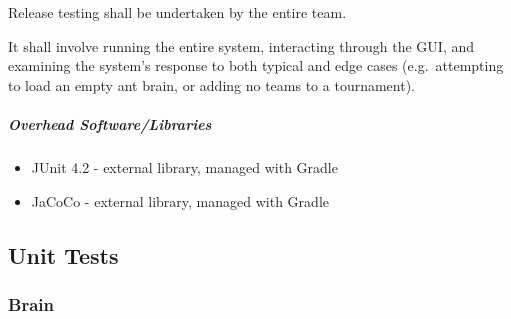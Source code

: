 \documentclass[11pt]{article}
\providecommand{\tightlist}{%
  \setlength{\itemsep}{0pt}\setlength{\parskip}{0pt}}
\begin{document}
Release testing shall be undertaken by the entire team.

It shall involve running the entire system, interacting through the GUI,
and examining the system's response to both typical and edge cases
(e.g.~attempting to load an empty ant brain, or adding no teams to a
tournament).

\subparagraph{Overhead
Software/Libraries}\label{overhead-softwarelibraries}
\begin{itemize}
\tightlist
\item
  JUnit 4.2 - external library, managed with Gradle
\item
  JaCoCo - external library, managed with Gradle
\end{itemize}

\newpage
\subsection{Unit Tests}\label{unit-tests}

\subsubsection{Brain}\label{brain}
\end{document}
